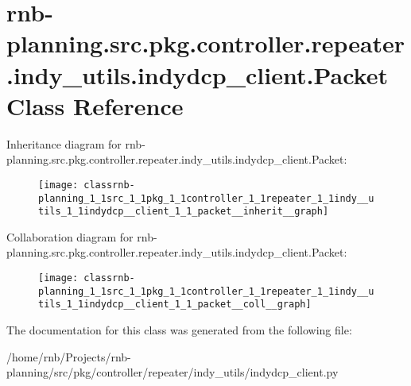 \hypertarget{classrnb-planning_1_1src_1_1pkg_1_1controller_1_1repeater_1_1indy__utils_1_1indydcp__client_1_1_packet}{}\section{rnb-\/planning.src.\+pkg.\+controller.\+repeater.\+indy\+\_\+utils.\+indydcp\+\_\+client.\+Packet Class Reference}
\label{classrnb-planning_1_1src_1_1pkg_1_1controller_1_1repeater_1_1indy__utils_1_1indydcp__client_1_1_packet}


Inheritance diagram for rnb-\/planning.src.\+pkg.\+controller.\+repeater.\+indy\+\_\+utils.\+indydcp\+\_\+client.\+Packet\+:\nopagebreak
\begin{figure}[H]
\begin{center}
\leavevmode
\texttt{[image: classrnb-planning\_1\_1src\_1\_1pkg\_1\_1controller\_1\_1repeater\_1\_1indy\_\_utils\_1\_1indydcp\_\_client\_1\_1\_packet\_\_inherit\_\_graph]}
\end{center}
\end{figure}


Collaboration diagram for rnb-\/planning.src.\+pkg.\+controller.\+repeater.\+indy\+\_\+utils.\+indydcp\+\_\+client.\+Packet\+:\nopagebreak
\begin{figure}[H]
\begin{center}
\leavevmode
\texttt{[image: classrnb-planning\_1\_1src\_1\_1pkg\_1\_1controller\_1\_1repeater\_1\_1indy\_\_utils\_1\_1indydcp\_\_client\_1\_1\_packet\_\_coll\_\_graph]}
\end{center}
\end{figure}


The documentation for this class was generated from the following file\+:\begin{DoxyCompactItemize}
\item 
/home/rnb/\+Projects/rnb-\/planning/src/pkg/controller/repeater/indy\+\_\+utils/indydcp\+\_\+client.\+py\end{DoxyCompactItemize}
